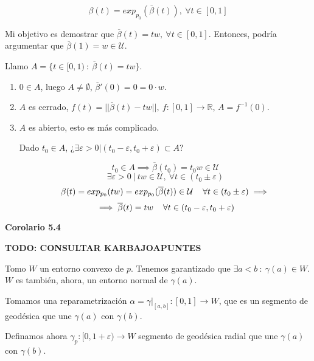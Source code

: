 \documentclass[openany]{book}
\begin{document}
\begin{demonstration}
  $$ \beta (t) = exp_{p_0}(\overline{\beta }(t)) , \ \forall t \in [0,1] $$

  Mi objetivo es demostrar que $\overline{\beta }(t) = tw, \ \forall t \in [0,1]$. Entonces, podría argumentar que $\overline{\beta }(1) = w \in \mathcal{U}$.

  Llamo $A= \{ t \in [0,1) \ : \  \overline{\beta }(t) = tw  \}$.
    \begin{enumerate}
      \item $0 \in A$, luego $A \ne \emptyset$, $\overline{\beta}'(0) = 0=0 \cdot w$.
      \item $A$ es cerrado, $f(t) = ||\overline{\beta }(t) - tw || , \ f:[0,1] \to \mathbb{R}$, $A= f ^{-1} (0)$.
      \item $A$ es abierto, esto es más complicado.

      Dado $t_0 \in A$, ¿$\exists \varepsilon >0 | (t_0 - \varepsilon , t_0 + \varepsilon ) \subset A$?

      $$ t_0 \in A \implies \overline{\beta }(t_0) = t_0 w \in \mathcal{U} $$
      $$ \exists \varepsilon >0 \ | \ tw \in \mathcal{U} , \ \forall t \in (t_0 \pm \varepsilon )$$
      $$ \beta (t) = exp_{p_0}(tw) = exp_{p_0}(\overline{\beta }(t))\in \mathcal{U} \hspace{0.4cm} \forall t \in (t_0 \pm \varepsilon ) \implies $$
      $$ \implies \overline{\beta }(t) = tw \hspace{0.4cm} \forall t \in (t_0 - \varepsilon , t_0 + \varepsilon )  $$
    \end{enumerate}
\end{demonstration}


\begin{center}
\textbf{Corolario 5.4}
\end{center}

\textbf{TODO: CONSULTAR KARBAJOAPUNTES}

\begin{demonstration}
  Tomo $W$ un entorno convexo de $ p $. Tenemos garantizado que $\exists a<b \ : \ \gamma (a) \in W$. $W$ es también, ahora, un entorno normal de $\gamma (a)$.

  Tomamos una reparametrización $\alpha = \gamma |_{[a,b]}: [0,1] \to W$, que es un segmento de geodésica que une $\gamma (a)$ con $\gamma (b)$.

  Definamos ahora $\gamma _p: [0,1 + \varepsilon) \to W$ segmento de geodésica radial que une $\gamma (a)$ con $\gamma (b)$.
\end{demonstration}
\end{document}
